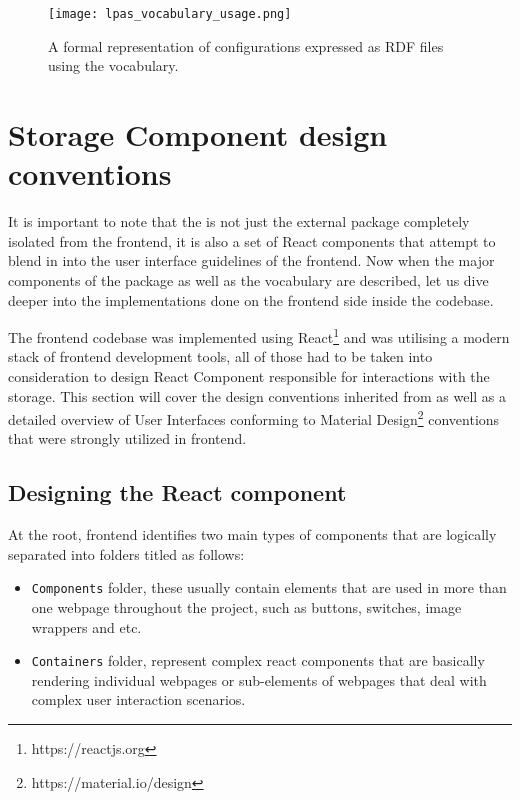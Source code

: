 \begin{figure}[h]
\centering
\texttt{[image: lpas\_vocabulary\_usage.png]}
\caption{A formal representation of \lpa{} configurations expressed as RDF files using the \lpas{} vocabulary.}
\label{fig:lpas_vocabulary_usage}
\end{figure}


\section{Storage Component design conventions}


It is important to note that the \lpas{} is not just the external package completely isolated from the \lpa{} frontend, it is also a set of React components that attempt to blend in into the user interface guidelines of the frontend. Now when the major components of the \lpas{} package as well as the \lpas{} vocabulary are described, let us dive deeper into the implementations done on the frontend side inside the \lpa{} codebase. 

The \lpa{} frontend codebase was implemented using React\footnote{https://reactjs.org} and was utilising a modern stack of frontend development tools, all of those had to be taken into consideration to design React Component responsible for interactions with the storage. This section will cover the design conventions inherited from \lpa{} as well as a detailed overview of User Interfaces conforming to Material Design\footnote{https://material.io/design} conventions that were strongly utilized in \lpa{} frontend.  

\subsection{Designing the React component}

At the root, \lpa{} frontend identifies two main types of components that are logically separated into folders titled as follows:
\begin{itemize}
	\item \texttt{Components} folder, these usually contain elements that are used in more than one webpage throughout the project, such as buttons, switches, image wrappers and etc.
	\item \texttt{Containers} folder, represent complex react components that are basically rendering individual webpages or sub-elements of webpages that deal with complex user interaction scenarios.
\end{itemize}

